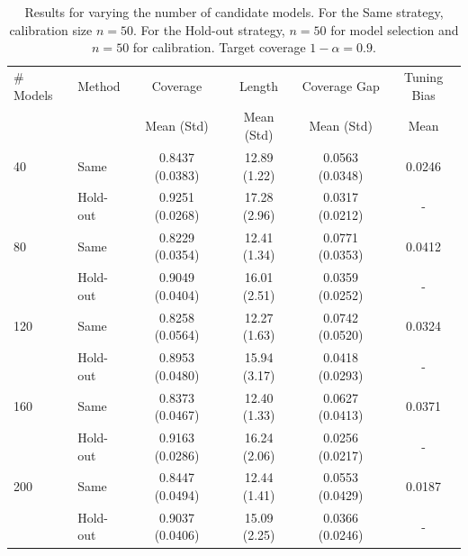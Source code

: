 \documentclass{article}
\newcommand{\1}{\mathbbm{1}}
\theoremstyle{plain}
\theoremstyle{definition}
\theoremstyle{remark}
\begin{document}
\begin{table}[htbp]
\centering
\caption{Results for varying the number of candidate models. For the Same strategy, calibration size $n=50$. For the Hold-out strategy, $n=50$ for model selection and $n=50$ for calibration. Target coverage $1-\alpha=0.9$.}
\label{tab:exp1_num_models_revised_with_tuning_bias}
\begin{tabular}{@{}llcccc@{}}
\toprule
\# Models & Method    & Coverage        & Length          & Coverage Gap    & Tuning Bias \\
          &           & Mean (Std)      & Mean (Std)      & Mean (Std)      & Mean        \\
\midrule
40        & Same      & 0.8437 (0.0383) & 12.89 (1.22)    & 0.0563 (0.0348) & 0.0246      \\
          & Hold-out  & 0.9251 (0.0268) & 17.28 (2.96)    & 0.0317 (0.0212) & -           \\
\midrule
80        & Same      & 0.8229 (0.0354) & 12.41 (1.34)    & 0.0771 (0.0353) & 0.0412      \\
          & Hold-out  & 0.9049 (0.0404) & 16.01 (2.51)    & 0.0359 (0.0252) & -           \\
\midrule
120       & Same      & 0.8258 (0.0564) & 12.27 (1.63)    & 0.0742 (0.0520) & 0.0324      \\
          & Hold-out  & 0.8953 (0.0480) & 15.94 (3.17)    & 0.0418 (0.0293) & -           \\
\midrule
160       & Same      & 0.8373 (0.0467) & 12.40 (1.33)    & 0.0627 (0.0413) & 0.0371      \\
          & Hold-out  & 0.9163 (0.0286) & 16.24 (2.06)    & 0.0256 (0.0217) & -           \\
\midrule
200       & Same      & 0.8447 (0.0494) & 12.44 (1.41)    & 0.0553 (0.0429) & 0.0187      \\
          & Hold-out  & 0.9037 (0.0406) & 15.09 (2.25)    & 0.0366 (0.0246) & -           \\
\bottomrule
\end{tabular}
\end{table}
\end{document}
